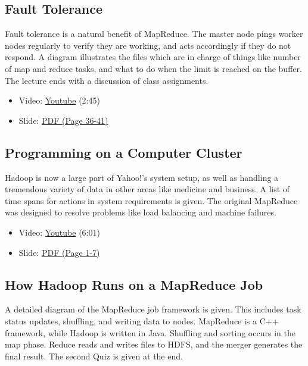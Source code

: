 \subsection{Fault Tolerance}\label{fault-tolerance}

Fault tolerance is a natural benefit of MapReduce. The master node pings
worker nodes regularly to verify they are working, and acts accordingly
if they do not respond. A diagram illustrates the files which are in
charge of things like number of map and reduce tasks, and what to do
when the limit is reached on the buffer. The lecture ends with a
discussion of class assignments.

\begin{itemize}
\tightlist
\item
  Video: \href{https://www.youtube.com/watch?v=a3AlOTmD42k}{Youtube}
  (2:45)
\item
  Slide:
  \href{https://drive.google.com/open?id=0B88HKpainTSfMnpCelpNQUpNdVE}{PDF
  (Page 36-41)}
\end{itemize}

\subsection{Programming on a Computer
Cluster}\label{programming-on-a-computer-cluster}

Hadoop is now a large part of Yahoo!'s system setup, as well as handling
a tremendous variety of data in other areas like medicine and business.
A list of time spans for actions in system requirements is given. The
original MapReduce was designed to resolve problems like load balancing
and machine failures.

\begin{itemize}
\tightlist
\item
  Video: \href{https://www.youtube.com/watch?v=rRR2ALa5CUA}{Youtube}
  (6:01)
\item
  Slide:
  \href{https://drive.google.com/open?id=0B88HKpainTSfd3hkTG4yY2FYUVE}{PDF
  (Page 1-7)}
\end{itemize}

\subsection{How Hadoop Runs on a MapReduce
Job}\label{how-hadoop-runs-on-a-mapreduce-job}

A detailed diagram of the MapReduce job framework is given. This
includes task status updates, shuffling, and writing data to nodes.
MapReduce is a C++ framework, while Hadoop is written in Java. Shuffling
and sorting occurs in the map phase. Reduce reads and writes files to
HDFS, and the merger generates the final result. The second Quiz is
given at the end.

